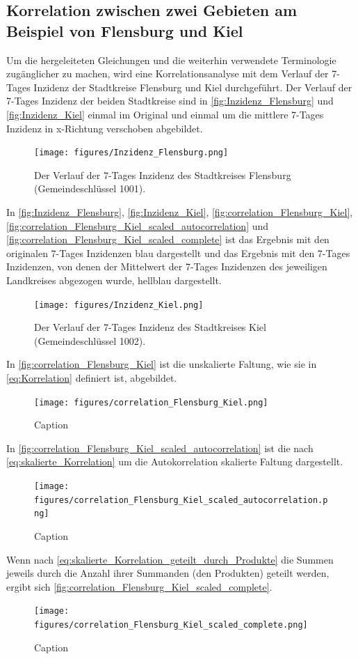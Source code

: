 \subsection{Korrelation zwischen zwei Gebieten am Beispiel von Flensburg und Kiel}
Um die hergeleiteten Gleichungen und die weiterhin verwendete Terminologie zugänglicher zu machen, wird eine Korrelationsanalyse mit dem Verlauf der 7-Tages Inzidenz der Stadtkreise Flensburg und Kiel durchgeführt. Der Verlauf der 7-Tages Inzidenz der beiden Stadtkreise sind in \autoref{fig:Inzidenz_Flensburg} und \autoref{fig:Inzidenz_Kiel} einmal im Original und einmal um die mittlere 7-Tages Inzidenz in x-Richtung verschoben abgebildet.

\begin{figure}[H]
    \centering
    \texttt{[image: figures/Inzidenz\_Flensburg.png]}
    \caption{Der Verlauf der 7-Tages Inzidenz des Stadtkreises Flensburg (Gemeindeschlüssel 1001).}
    \label{fig:Inzidenz_Flensburg}
\end{figure}
In \autoref{fig:Inzidenz_Flensburg}, \autoref{fig:Inzidenz_Kiel}, \autoref{fig:correlation_Flensburg_Kiel}, \autoref{fig:correlation_Flensburg_Kiel_scaled_autocorrelation} und \autoref{fig:correlation_Flensburg_Kiel_scaled_complete} ist das Ergebnis mit den originalen 7-Tages Inzidenzen blau dargestellt und das Ergebnis mit den 7-Tages Inzidenzen, von denen der Mittelwert der 7-Tages Inzidenzen des jeweiligen Landkreises abgezogen wurde, hellblau dargestellt.
\begin{figure}[H]
    \centering
    \texttt{[image: figures/Inzidenz\_Kiel.png]}
    \caption{Der Verlauf der 7-Tages Inzidenz des Stadtkreises Kiel (Gemeindeschlüssel 1002).}
    \label{fig:Inzidenz_Kiel}
\end{figure}
In \autoref{fig:correlation_Flensburg_Kiel} ist die unskalierte Faltung, wie sie in \autoref{eq:Korrelation} definiert ist, abgebildet.
\begin{figure}[H]
    \centering
    \texttt{[image: figures/correlation\_Flensburg\_Kiel.png]}
    \caption{Caption}
    \label{fig:correlation_Flensburg_Kiel}
\end{figure}
In \autoref{fig:correlation_Flensburg_Kiel_scaled_autocorrelation} ist die nach \autoref{eq:skalierte_Korrelation} um die Autokorrelation skalierte Faltung dargestellt.
\begin{figure}[H]
    \centering
    \texttt{[image: figures/correlation\_Flensburg\_Kiel\_scaled\_autocorrelation.png]}
    \caption{Caption}
    \label{fig:correlation_Flensburg_Kiel_scaled_autocorrelation}
\end{figure}
Wenn nach \autoref{eq:skalierte_Korrelation_geteilt_durch_Produkte} die  Summen jeweils durch die Anzahl ihrer Summanden (den Produkten) geteilt werden, ergibt sich \autoref{fig:correlation_Flensburg_Kiel_scaled_complete}.
\begin{figure}[H]
    \centering
    \texttt{[image: figures/correlation\_Flensburg\_Kiel\_scaled\_complete.png]}
    \caption{Caption}
    \label{fig:correlation_Flensburg_Kiel_scaled_complete}
\end{figure}

